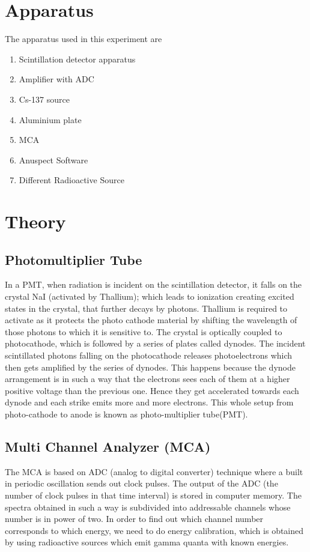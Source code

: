 \documentclass[%
 reprint,
nofootinbib,
 amsmath,amssymb,
 aps,
floatfix,
]{revtex4-2}
\begin{document}
\section{Apparatus}
    The apparatus used in this experiment are
    \begin{enumerate}
        \item Scintillation detector apparatus
        \item Amplifier with ADC
        \item Cs-137 source
        \item Aluminium plate
        \item MCA
        \item Anuspect Software
        \item Different Radioactive Source
    \end{enumerate}



\section{Theory}
\subsection{Photomultiplier Tube}
In a PMT, when radiation is incident on the scintillation detector, it falls on the crystal NaI (activated by Thallium); which leads to ionization creating excited states in the crystal, that further decays by photons. Thallium is required to activate as it protects the photo cathode material by shifting the wavelength of those photons to which it is sensitive to. The crystal is optically coupled to photocathode, which is followed by a series of plates called dynodes. The incident scintillated photons falling on the photocathode releases photoelectrons which then gets amplified by the series of dynodes. This happens because the dynode arrangement is in such a way that the electrons sees each of them at a higher positive voltage than the previous one. Hence they get accelerated towards each dynode and each strike emits more and more electrons. This whole setup from
photo-cathode to anode is known as photo-multiplier tube(PMT).\\

\subsection{Multi Channel Analyzer (MCA)}
 The MCA is based on ADC (analog to digital converter) technique where a built in periodic oscillation sends out clock pulses. The output of the ADC (the number of clock pulses in that time interval) is stored in computer memory. The spectra obtained in such a way is subdivided into addressable channels whose number is in power of two. In order to find out which channel number corresponds to which energy, we need to do energy calibration, which is obtained by using radioactive sources which emit gamma quanta with known energies.
 
\end{document}
